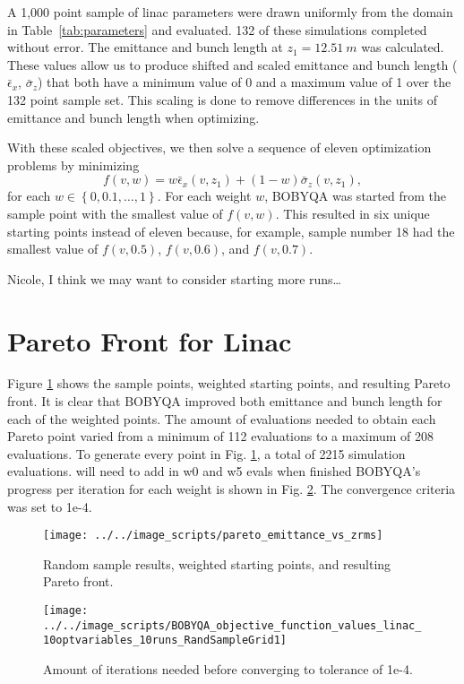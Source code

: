 \documentclass[letterpaper,  %
              ]{jacow}
\newcommand{\nnnote}[1]{\textsf{{\color{blue}{ NN note:}   #1 }}}
\newcommand{\jlnote}[1]{\textsf{{\color{green}{ JL note:}   #1 }}}
\begin{document}
A 1,000 point sample of linac parameters were drawn uniformly from the domain
in Table~\ref{tab:parameters} and evaluated. 132 of these simulations completed
without error. The emittance and bunch length at $z_1=\SI{12.51}{m}$ was
calculated. These values allow us to produce shifted and scaled emittance
and bunch length ($\bar{\epsilon}_x$, $\bar{\sigma}_z$) that both have a
minimum value of 0 and a maximum value of 1 over the 132 point sample set.
This scaling is done to remove differences in the units of emittance and bunch length
when optimizing.

With these scaled objectives, we then solve a sequence of eleven optimization problems
by minimizing 
\begin{equation}
  f(v,w) = w \bar{\epsilon}_x(v,z_1) + (1-w) \bar{\sigma}_z(v,z_1),
\label{eq:newobj}
\end{equation}
for each $w \in \left\{ 0,0.1,\ldots,1 \right\}$. For each weight $w$, BOBYQA
was started from the sample point with the smallest value of $f(v,w)$.  This
resulted in six unique starting points instead of eleven because, for example, sample number 18
had the smallest value of $f(v,0.5)$, $f(v,0.6)$, and $f(v,0.7)$.

\jlnote{Nicole, I think we may want to consider starting more runs\ldots}
\section{Pareto Front for Linac} 
Figure \ref{fig:pareto} shows the sample points, 
weighted starting points, and resulting Pareto front.
It is clear that BOBYQA improved both emittance and bunch 
length for each of the weighted points. 
The amount of evaluations needed to obtain each Pareto point 
varied from a minimum of 112 evaluations to a maximum of 208 
evaluations. To generate every point in Fig. \ref{fig:pareto}, 
a total of 2215 simulation evaluations.\nnnote{will need to add in w0 and w5 evals when finished}
BOBYQA's progress per iteration for each weight is shown in 
Fig. \ref{fig:iterations}. The convergence criteria was set to 1e-4.  

\begin{figure}[h]
	\centering
	\texttt{[image: ../../image\_scripts/pareto\_emittance\_vs\_zrms]}
	\caption{Random sample results, weighted starting points, and resulting Pareto front.}
	\label{fig:pareto}
\end{figure}

\begin{figure}[h]
	\centering
	\texttt{[image: ../../image\_scripts/BOBYQA\_objective\_function\_values\_linac\_10optvariables\_10runs\_RandSampleGrid1]}
	\caption{Amount of iterations needed before converging to tolerance of 1e-4.}
	\label{fig:iterations}
\end{figure}
\end{document}
